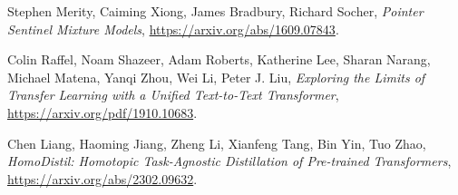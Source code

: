 \begin{thebibliography}{9}
	Stephen Merity, Caiming Xiong, James Bradbury, Richard Socher,
	\textit{Pointer Sentinel Mixture Models},
	\url{https://arxiv.org/abs/1609.07843}.

	Colin Raffel, Noam Shazeer, Adam Roberts, Katherine Lee, Sharan Narang, Michael Matena, Yanqi Zhou, Wei Li, Peter J. Liu,	
	\textit{Exploring the Limits of Transfer Learning with a Unified Text-to-Text Transformer},
	\url{https://arxiv.org/pdf/1910.10683}.

	Chen Liang, Haoming Jiang, Zheng Li, Xianfeng Tang, Bin Yin, Tuo Zhao,
	\textit{HomoDistil: Homotopic Task-Agnostic Distillation of Pre-trained Transformers},
	\url{https://arxiv.org/abs/2302.09632}.

\end{thebibliography}